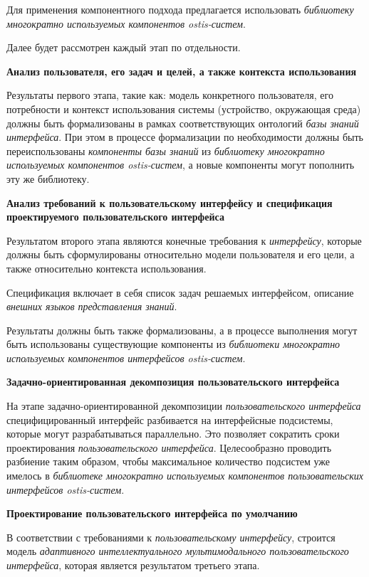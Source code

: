 Для применения компонентного подхода предлагается использовать \textit{библиотеку многократно используемых компонентов ostis-систем}.

Далее будет рассмотрен каждый этап по отдельности.

\textbf{Анализ пользователя, его задач и целей, а также контекста использования}

Результаты первого этапа, такие как: модель конкретного пользователя, его потребности и контекст использования системы (устройство, окружающая среда) должны быть формализованы в рамках соответствующих онтологий \textit{базы знаний} \textit{интерфейса}. 
При этом в процессе формализации по необходимости должны быть переиспользованы \textit{компоненты базы знаний} из \textit{библиотеку многократно используемых компонентов ostis-систем}, а новые компоненты могут пополнить эту же библиотеку.

\textbf{Анализ требований к пользовательскому интерфейсу и спецификация проектируемого пользовательского интерфейса}

Результатом второго этапа являются конечные требования к \textit{интерфейсу}, которые должны быть сформулированы относительно модели пользователя и его цели, а также относительно контекста использования.

Спецификация включает в себя список задач решаемых интерфейсом, описание \textit{внешних языков представления знаний}.

Результаты должны быть также формализованы, а в процессе выполнения могут быть использованы существующие компоненты из \textit{библиотеки многократно используемых компонентов интерфейсов ostis-систем}.

\textbf{Задачно-ориентированная декомпозиция пользовательского интерфейса}

На этапе задачно-ориентированной декомпозиции \textit{пользовательского интерфейса} специфицированный интерфейс разбивается на интерфейсные подсистемы, которые могут разрабатываться параллельно. Это позволяет сократить сроки проектирования \textit{пользовательского интерфейса}. Целесообразно проводить разбиение таким образом, чтобы максимальное количество подсистем уже имелось в \textit{библиотеке многократно используемых компонентов пользовательских интерфейсов ostis-систем}.

\textbf{Проектирование пользовательского интерфейса по умолчанию}

В соответствии с требованиями к \textit{пользовательскому интерфейсу}, строится модель \textit{адаптивного интеллектуального мультимодального пользовательского интерфейса}, которая является результатом третьего этапа.

